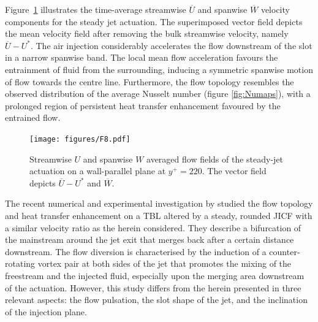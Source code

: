 Figure~\ref{fig:PIV_ref} illustrates the time-average streamwise $\overline{U}$ and spanwise $\overline{W}$ velocity components for the steady jet actuation. The superimposed vector field depicts the mean velocity field after removing the bulk streamwise velocity, namely $\overline{U}-U^*$. The air injection considerably accelerates the flow downstream of the slot in a narrow spanwise band. The local mean flow acceleration favours the entrainment of fluid from the surrounding, inducing a symmetric spanwise motion of flow towards the centre line. Furthermore, the flow topology resembles the observed distribution of the average Nusselt number (figure \ref{fig:Numaps}), with a prolonged region of persistent heat transfer enhancement favoured by the entrained flow. 

\begin{figure}[t] %
    \centering
    \texttt{[image: figures/F8.pdf]}
    \caption{Streamwise $U$ and spanwise $W$ averaged flow fields of the steady-jet actuation on a wall-parallel plane at $y^+ = 220$. The vector field depicts $\overline{U}-U^*$ and $\overline{W}$.}
    \label{fig:PIV_ref}
\end{figure}

The recent numerical and experimental investigation by \citet{puzu2019jet} studied the flow topology and heat transfer enhancement on a TBL altered by a steady, rounded JICF with a similar velocity ratio as the herein considered. They describe a bifurcation of the mainstream around the jet exit that merges back after a certain distance downstream. The flow diversion is characterised by the induction of a counter-rotating vortex pair at both sides of the jet that promotes the mixing of the freestream and the injected fluid, especially upon the merging area downstream of the actuation. However, this study differs from the herein presented in three relevant aspects: the flow pulsation, the slot shape of the jet, and the inclination of the injection plane.

